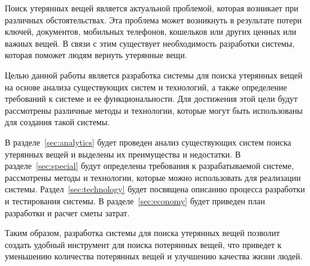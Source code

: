 \label{sec:introduction}

Поиск утерянных вещей является актуальной проблемой, которая возникает при различных обстоятельствах. Эта проблема может возникнуть в результате потери ключей, документов, мобильных телефонов, кошельков или других ценных или важных вещей. В связи с этим существует необходимость разработки системы, которая поможет людям вернуть утерянные вещи.

Целью данной работы является разработка системы для поиска утерянных вещей на основе анализа существующих систем и технологий, а также определение требований к системе и ее функциональности. Для достижения этой цели будут рассмотрены различные методы и технологии, которые могут быть использованы для создания такой системы.

В разделе~\ref{sec:analytics} будет проведен анализ существующих систем поиска утерянных вещей и выделены их преимущества и недостатки. В разделе~\ref{sec:special} будут определены требования к разрабатываемой системе, рассмотрены методы и технологии, которые можно использовать для реализации системы. Раздел~\ref{sec:technology} будет посвящена описанию процесса разработки и тестирования системы. В разделе~\ref{sec:economy} будет приведен план разработки и расчет сметы затрат.

Таким образом, разработка системы для поиска утерянных вещей позволит создать удобный инструмент для поиска потерянных вещей, что приведет к уменьшению количества потерянных вещей и улучшению качества жизни людей.